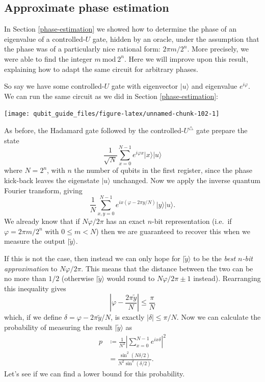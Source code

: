 \documentclass[fleqn,a4paper]{article}
\theoremstyle{definition}
\theoremstyle{definition}
\theoremstyle{definition}
\theoremstyle{definition}
\theoremstyle{remark}
\begin{document}
\hypertarget{approximate-phase-estimation}{%
\subsection{Approximate phase estimation}\label{approximate-phase-estimation}}

In Section \ref{phase-estimation} we showed how to determine the phase of an eigenvalue of a controlled-\(U\) gate, hidden by an oracle, under the assumption that the phase was of a particularly nice rational form: \(2\pi m/2^n\).
More precisely, we were able to find the integer \(m\ \mathrm{mod}\ 2^n\).
Here we will improve upon this result, explaining how to adapt the same circuit for arbitrary phases.

So say we have some controlled-\(U\) gate with eigenvector \(|u\rangle\) and eigenvalue \(e^{i\varphi}\).
We can run the same circuit as we did in Section \ref{phase-estimation}:

\begin{center}\texttt{[image: qubit\_guide\_files/figure-latex/unnamed-chunk-102-1]} \end{center}

As before, the Hadamard gate followed by the controlled-\(U^\triangle\) gate prepare the state
\[
  \frac{1}{\sqrt{N}} \sum_{x=0}^{N-1} e^{i\varphi x}|x\rangle|u\rangle
\]
where \(N=2^n\), with \(n\) the number of qubits in the first register, since the phase kick-back leaves the eigenstate \(|u\rangle\) unchanged.
Now we apply the inverse quantum Fourier transform, giving
\[
  \frac{1}{N} \sum_{x,y=0}^{N-1} e^{ix(\varphi-2\pi y/N)}|y\rangle|u\rangle.
\]
We already know that if \(N\varphi/2\pi\) has an exact \(n\)-bit representation (i.e.~if \(\varphi=2\pi m/2^n\) with \(0\leqslant m<N\)) then we are guaranteed to recover this when we measure the output \(|\widetilde{y}\rangle\).

If this is not the case, then instead we can only hope for \(|\widetilde{y}\rangle\) to be the \emph{best \(n\)-bit approximation} to \(N\varphi/2\pi\).
This means that the distance between the two can be no more than \(1/2\) (otherwise \(|\widetilde{y}\rangle\) would round to \(N\varphi/2\pi\pm1\) instead).
Rearranging this inequality gives
\[
  \left\vert\varphi-\frac{2\pi\widetilde{y}}{N}\right\vert
  \leqslant\frac{\pi}{N}
\]
which, if we define \(\delta=\varphi-2\pi\widetilde{y}/N\), is exactly \(|\delta|\leqslant\pi/N\).
Now we can calculate the probability of measuring the result \(|\widetilde{y}\rangle\) as
\[
  \begin{aligned}
    p
    &\coloneqq \frac{1}{N^2}\left\vert\sum_{x=0}^{N-1} e^{ix\delta}\right\vert^2
  \\&= \frac{\sin^2(N\delta/2)}{N^2\sin^2(\delta/2)}.
  \end{aligned}
\]
Let's see if we can find a lower bound for this probability.
\end{document}
